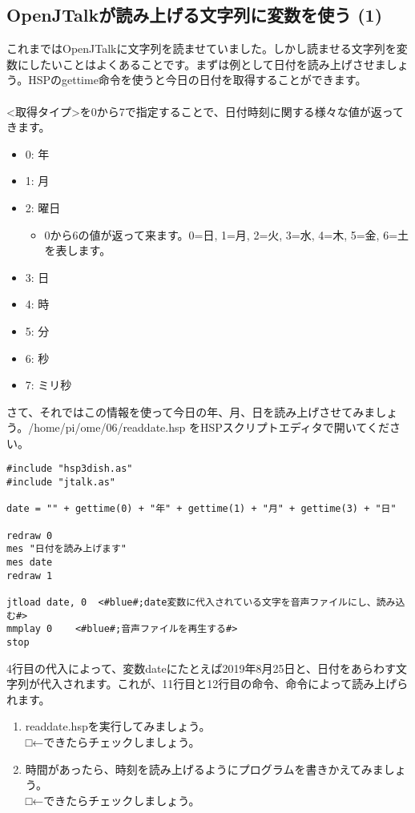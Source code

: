\subsection{OpenJTalkが読み上げる文字列に変数を使う (1)}
これまではOpenJTalkに文字列を読ませていました。しかし読ませる文字列を変数にしたいことはよくあることです。まずは例として日付を読み上げさせましょう。HSPのgettime命令を使うと今日の日付を取得することができます。\\
\\
<取得タイプ>を0から7で指定することで、日付時刻に関する様々な値が返ってきます。
\begin{itemize}
\item 0: 年
\item 1: 月
\item 2: 曜日
\begin{itemize}
 \item 0から6の値が返って来ます。0=日, 1=月, 2=火, 3=水, 4=木, 5=金, 6=土 を表します。
\end{itemize}
\item 3: 日
\item 4: 時
\item 5: 分
\item 6: 秒
\item 7: ミリ秒
\end{itemize}
さて、それではこの情報を使って今日の年、月、日を読み上げさせてみましょう。/home/pi/ome/06/readdate.hsp をHSPスクリプトエディタで開いてください。\\

\begin{lstlisting}[caption=readdate.hsp,label=readdate.hsp]
#include "hsp3dish.as"
#include "jtalk.as"

date = "" + gettime(0) + "年" + gettime(1) + "月" + gettime(3) + "日"

redraw 0
mes "日付を読み上げます"
mes date
redraw 1

jtload date, 0	<#blue#;date変数に代入されている文字を音声ファイルにし、読み込む#>
mmplay 0	<#blue#;音声ファイルを再生する#>
stop
\end{lstlisting}

4行目の代入によって、変数dateにたとえば2019年8月25日と、日付をあらわす文字列が代入されます。これが、11行目と12行目の命令、命令によって読み上げられます。\\

\begin{tcolorbox}[title=\useOmetoi]
\begin{enumerate}
\item readdate.hspを実行してみましょう。\\□←できたらチェックしましょう。
\item 時間があったら、時刻を読み上げるようにプログラムを書きかえてみましょう。\\□←できたらチェックしましょう。
\end{enumerate}
\end{tcolorbox}